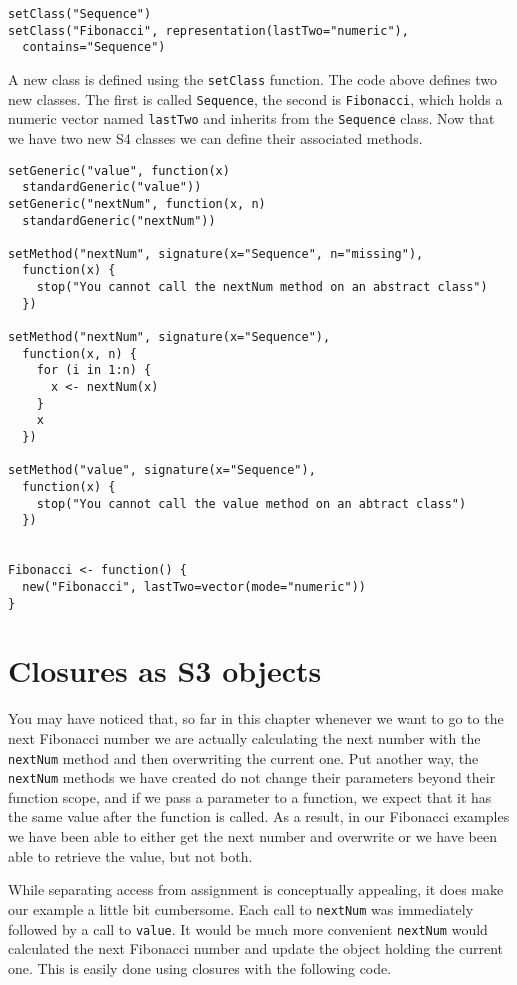 \begin{verbatim}
setClass("Sequence")
setClass("Fibonacci", representation(lastTwo="numeric"),
  contains="Sequence")
\end{verbatim}

A new class is defined using the \texttt{setClass} function. The code
above defines two new classes. The first is called \texttt{Sequence},
the second is \texttt{Fibonacci}, which holds a numeric vector named
\texttt{lastTwo} and inherits from the \texttt{Sequence} class. Now that
we have two new S4 classes we can define their associated methods.

\begin{verbatim}
setGeneric("value", function(x)
  standardGeneric("value"))
setGeneric("nextNum", function(x, n)
  standardGeneric("nextNum"))

setMethod("nextNum", signature(x="Sequence", n="missing"),
  function(x) {
    stop("You cannot call the nextNum method on an abstract class")
  })

setMethod("nextNum", signature(x="Sequence"),
  function(x, n) {
    for (i in 1:n) {
      x <- nextNum(x)
    }
    x
  })

setMethod("value", signature(x="Sequence"),
  function(x) {
    stop("You cannot call the value method on an abtract class")
  })
  

Fibonacci <- function() {
  new("Fibonacci", lastTwo=vector(mode="numeric"))
}
\end{verbatim}

\section{Closures as S3 objects}

You may have noticed that, so far in this chapter whenever we want to go
to the next Fibonacci number we are actually calculating the next number
with the \texttt{nextNum} method and then overwriting the current one.
Put another way, the \texttt{nextNum} methods we have created do not
change their parameters beyond their function scope, and if we pass a
parameter to a function, we expect that it has the same value after the
function is called. As a result, in our Fibonacci examples we have been
able to either get the next number and overwrite or we have been able to
retrieve the value, but not both.

While separating access from assignment is conceptually appealing, it
does make our example a little bit cumbersome. Each call to
\texttt{nextNum} was immediately followed by a call to \texttt{value}.
It would be much more convenient \texttt{nextNum} would calculated the
next Fibonacci number and update the object holding the current one.
This is easily done using closures with the following code.

